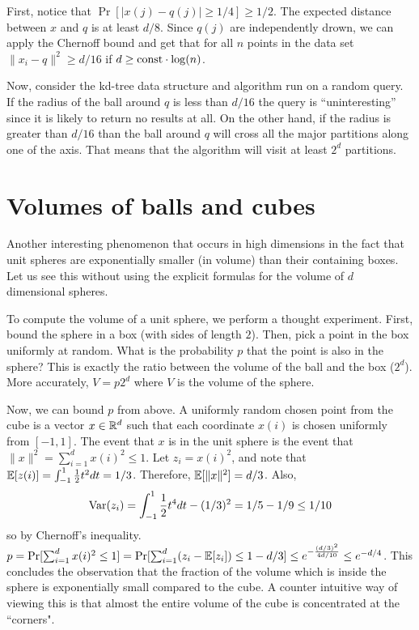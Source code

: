\documentclass{article}
\begin{document}
First, notice that $\Pr[|x(j)- q(j)| \ge 1/4] \ge 1/2$. The expected distance between $x$ and $q$ is at least $d/8$.
Since $q(j)$ are independently drown, we can apply the Chernoff bound and get that for all $n$ points in the data set
$\|x_i-q\|^2 \ge d/16$ if $d \ge {\operatorname{const}}\cdot\log(n)$.

Now, consider the kd-tree data structure and algorithm run on a random query.
If the radius of the ball around $q$ is less than $d/16$ the query is ``uninteresting'' since it is likely to return no results at all.
On the other hand, if the radius is greater than $d/16$ than the ball around $q$ will cross all the major partitions 
along one of the axis. That means that the algorithm will visit at least $2^d$ partitions.


\section{Volumes of balls and cubes}
Another interesting phenomenon that occurs in high dimensions in the fact that unit spheres 
are exponentially smaller (in volume) than their containing boxes.
Let us see this without using the explicit formulas for the volume of $d$ dimensional spheres.

To compute the volume of a unit sphere, we perform a thought experiment.
First, bound the sphere in a box (with sides of length $2$).
Then, pick a point in the box uniformly at random. What is the probability $p$ that
the point is also in the sphere? This is exactly the ratio between the volume of the ball and the box ($2^d$).
More accurately, $V = p2^d$ where $V$ is the volume of the sphere.

Now, we can bound $p$ from above. 
A uniformly random chosen point from the cube is a vector $x \in {\mathbb{R}}^d$ such that each coordinate $x(i)$
is chosen uniformly from $[-1,1]$. The event that $x$ is in the unit sphere is the event that $\|x\|^2 = \sum_{i=1}^{d}x(i)^2 \le 1$.
Let $z_i = x(i)^2$, and note that 
${\mathbb E}[z(i)] = \int_{-1}^{1}\frac{1}{2}t^2 dt = 1/3$. Therefore, ${\mathbb E}[\|x\|^2] = d/3$. 
Also, 
\[
{\operatorname{Var}}(z_i)  = \int_{-1}^{1}\frac{1}{2}t^4 dt  - (1/3)^2  = 1/5 - 1/9 \le 1/10
\]
so by Chernoff's inequality.
$p = \Pr[\sum_{i=1}^{d}x(i)^2 \le 1]  = \Pr[\sum_{i=1}^{d}(z_i -{\mathbb E}[z_i] ) \le 1-d/3] \le e^{-\frac{(d/3)^2}{4d/10}} \le e^{-d/4}$.
This concludes the observation that the fraction of the volume which is inside the sphere is 
exponentially small compared to the cube.
A counter intuitive way of viewing this is that almost the entire volume of the cube is concentrated at the ``corners".
\end{document}
